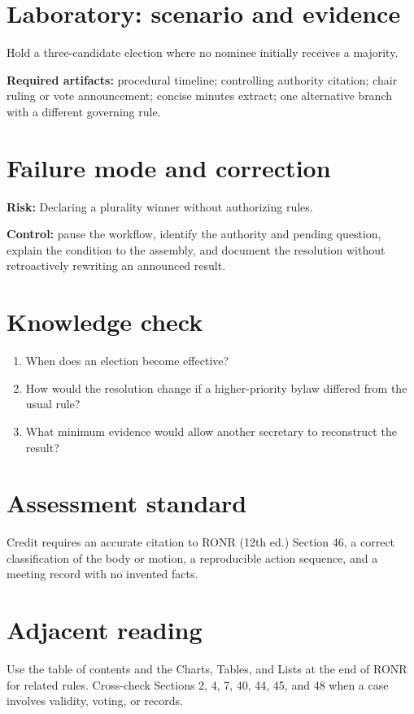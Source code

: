 \documentclass[11pt]{article}
\begin{document}
\section{Laboratory: scenario and evidence}
Hold a three-candidate election where no nominee initially receives a majority.

\textbf{Required artifacts:} procedural timeline; controlling authority citation; chair ruling or vote announcement; concise minutes extract; one alternative branch with a different governing rule.

\section{Failure mode and correction}
\textbf{Risk:} Declaring a plurality winner without authorizing rules.

\textbf{Control:} pause the workflow, identify the authority and pending question, explain the condition to the assembly, and document the resolution without retroactively rewriting an announced result.

\section{Knowledge check}
\begin{enumerate}[leftmargin=*,itemsep=4pt]
\item When does an election become effective?
\item How would the resolution change if a higher-priority bylaw differed from the usual rule?
\item What minimum evidence would allow another secretary to reconstruct the result?
\end{enumerate}

\section{Assessment standard}
Credit requires an accurate citation to RONR (12th ed.) Section 46, a correct classification of the body or motion, a reproducible action sequence, and a meeting record with no invented facts.

\section{Adjacent reading}
Use the table of contents and the Charts, Tables, and Lists at the end of RONR for related rules. Cross-check Sections 2, 4, 7, 40, 44, 45, and 48 when a case involves validity, voting, or records.
\end{document}
